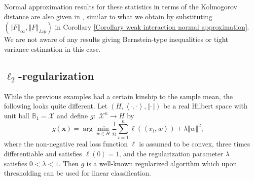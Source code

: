 \documentclass[final,12pt]{colt2018} %
\begin{document}
					Normal approximation results for these statistics in terms of the Kolmogorov
					distance are also given in \cite{Chen 2010}, similar to what we
					obtain by substituting $\left( \left\Vert F\right\Vert _{\infty },\left\Vert
					F\right\Vert _{Lip}\right) $ in Corollary \ref{Corollary weak
						interaction normal approximation}. We are not aware of any results giving
					Bernstein-type inequalities or tight variance estimation in this case.
					
					\subsection{$\ell_2$-regularization\label{Subsection L_2 regularization}}
					
					While the previous examples had a certain kinship to the sample mean, the
					following looks quite different. Let $\left( H,\left\langle \cdot,\cdot\right\rangle
					,\left\Vert \cdot\right\Vert \right) $ be a real Hilbert space with unit ball $%
					\mathbb{B}_{1}=\mathcal{X}$ and define $g:$ $\mathcal{X}^{n}\rightarrow H$ by%
					\begin{equation}
					g\left( \mathbf{x}\right) =\arg \min_{w\in H}\frac{1}{n}\sum_{i=1}^{n}\ell
					\left( \left\langle x_{i},w\right\rangle \right) +\lambda \left\Vert
					w\right\Vert ^{2},  \label{Define g}
					\end{equation}%
					where the non-negative real loss function $\ell $ is assumed to be convex,
					three times differentiable and satisfies $\ell \left( 0\right) =1$, and the
					regularization parameter $\lambda $ satisfies $0<\lambda <1$. Then $g$ is a
					well-known regularized algorithm which upon thresholding can be used for
					linear classification.
					
\end{document}
